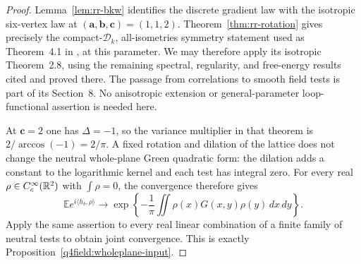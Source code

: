 \begin{proof}
Lemma~\ref{lem:rr-bkw} identifies the discrete gradient law with
the isotropic six-vertex law at $(\mathbf a,\mathbf b,\mathbf c)
=(1,1,2)$.  Theorem~\ref{thm:rr-rotation} gives precisely the
compact-$\mathcal D_k$, all-isometries symmetry statement used as
Theorem~4.1 in \cite{SixVertexGFF2026}, at this parameter.
We may therefore apply its isotropic Theorem~2.8, using the
remaining spectral, regularity, and free-energy results cited and
proved there.  The passage from correlations to smooth field
tests is part of its Section~8.  No anisotropic extension or
general-parameter loop-functional assertion is needed here.

At $\mathbf c=2$ one has $\Delta=-1$, so the variance multiplier
in that theorem is $2/\arccos(-1)=2/\pi$.  A fixed rotation and
dilation of the lattice does not change the neutral whole-plane
Green quadratic form: the dilation adds a constant to the
logarithmic kernel and each test has integral zero.  For every
real $\rho\in C_c^\infty(\mathbb R^2)$ with $\int\rho=0$, the convergence
therefore gives
\[
 \mathbb E e^{i\langle h_\delta,\rho\rangle}
 \longrightarrow
 \exp\left\{-\frac1\pi
       \iint \rho(x)G(x,y)\rho(y)\,dx\,dy\right\}.
\]
Apply the same assertion to every real linear combination of a
finite family of neutral tests to obtain joint convergence.
This is exactly Proposition~\ref{q4field:wholeplane-input}.
\end{proof}
